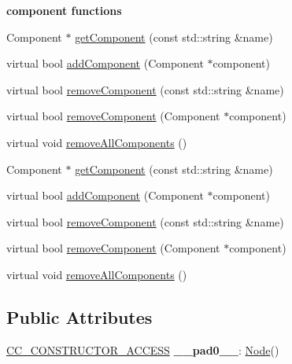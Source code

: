 \begin{Indent}\textbf{ component functions}\par
\begin{DoxyCompactItemize}
\item 
Component $\ast$ \hyperlink{classNode_a149c99ff0cb7285f5e51d331672adbb9}{get\+Component} (const std\+::string \&name)
\item 
virtual bool \hyperlink{classNode_af5f2b77fdfde809abc13432ce526e706}{add\+Component} (Component $\ast$component)
\item 
virtual bool \hyperlink{classNode_acce5160468bfd35be6804b8cf7a88142}{remove\+Component} (const std\+::string \&name)
\item 
virtual bool \hyperlink{classNode_a857bce3dc69f84d4746fbbb8ab2ea720}{remove\+Component} (Component $\ast$component)
\item 
virtual void \hyperlink{classNode_a6c5d3cf6a590df570cac7ddbfe85c9d3}{remove\+All\+Components} ()
\item 
Component $\ast$ \hyperlink{classNode_a2867ee7521172ead4346cb755e9dbaca}{get\+Component} (const std\+::string \&name)
\item 
virtual bool \hyperlink{classNode_a1c19037b621c89b205fdb3ad620b1f8d}{add\+Component} (Component $\ast$component)
\item 
virtual bool \hyperlink{classNode_a79887a0cfaa3705f0478c14044f93eea}{remove\+Component} (const std\+::string \&name)
\item 
virtual bool \hyperlink{classNode_a4b9ccb90f2206b1d9b8ccf7b96a361f5}{remove\+Component} (Component $\ast$component)
\item 
virtual void \hyperlink{classNode_a4b776f7b64fc5d0fd32280eabf5c3a71}{remove\+All\+Components} ()
\end{DoxyCompactItemize}
\end{Indent}
\subsection*{Public Attributes}
\begin{DoxyCompactItemize}
\item 
\mbox{\label{classNode_aac63bb9c7ce8fe00a3317e7d29fb40de}} 
\hyperlink{_2cocos2d_2cocos_2base_2ccConfig_8h_a25ef1314f97c35a2ed3d029b0ead6da0}{C\+C\+\_\+\+C\+O\+N\+S\+T\+R\+U\+C\+T\+O\+R\+\_\+\+A\+C\+C\+E\+SS} {\bfseries \+\_\+\+\_\+pad0\+\_\+\+\_\+}\+: \hyperlink{classNode}{Node}()
\end{DoxyCompactItemize}
